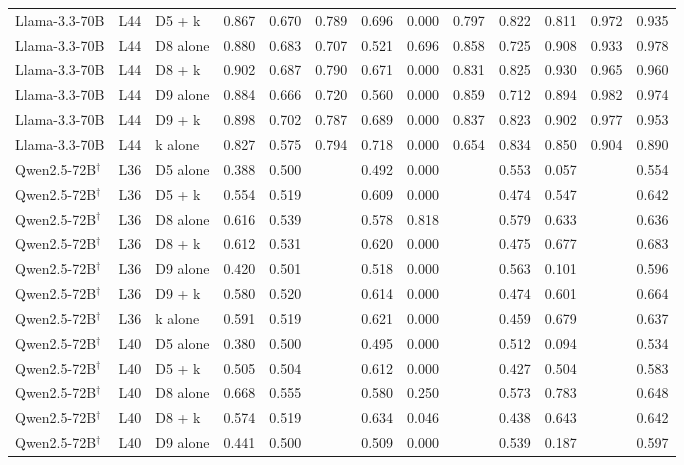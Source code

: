 \begin{table}
\begin{tabular}{lllrrrrrrrrrr}
Llama-3.3-70B & L44 & D5 + k & 0.867 & 0.670 & 0.789 & 0.696 & 0.000 & 0.797 & 0.822 & 0.811 & 0.972 & 0.935 \\
Llama-3.3-70B & L44 & D8 alone & 0.880 & 0.683 & 0.707 & 0.521 & 0.696 & 0.858 & 0.725 & 0.908 & 0.933 & 0.978 \\
Llama-3.3-70B & L44 & D8 + k & 0.902 & 0.687 & 0.790 & 0.671 & 0.000 & 0.831 & 0.825 & 0.930 & 0.965 & 0.960 \\
Llama-3.3-70B & L44 & D9 alone & 0.884 & 0.666 & 0.720 & 0.560 & 0.000 & 0.859 & 0.712 & 0.894 & 0.982 & 0.974 \\
Llama-3.3-70B & L44 & D9 + k & 0.898 & 0.702 & 0.787 & 0.689 & 0.000 & 0.837 & 0.823 & 0.902 & 0.977 & 0.953 \\
Llama-3.3-70B & L44 & k alone & 0.827 & 0.575 & 0.794 & 0.718 & 0.000 & 0.654 & 0.834 & 0.850 & 0.904 & 0.890 \\
Qwen2.5-72B$^\dagger$ & L36 & D5 alone & 0.388 & 0.500 &  & 0.492 & 0.000 &  & 0.553 & 0.057 &  & 0.554 \\
Qwen2.5-72B$^\dagger$ & L36 & D5 + k & 0.554 & 0.519 &  & 0.609 & 0.000 &  & 0.474 & 0.547 &  & 0.642 \\
Qwen2.5-72B$^\dagger$ & L36 & D8 alone & 0.616 & 0.539 &  & 0.578 & 0.818 &  & 0.579 & 0.633 &  & 0.636 \\
Qwen2.5-72B$^\dagger$ & L36 & D8 + k & 0.612 & 0.531 &  & 0.620 & 0.000 &  & 0.475 & 0.677 &  & 0.683 \\
Qwen2.5-72B$^\dagger$ & L36 & D9 alone & 0.420 & 0.501 &  & 0.518 & 0.000 &  & 0.563 & 0.101 &  & 0.596 \\
Qwen2.5-72B$^\dagger$ & L36 & D9 + k & 0.580 & 0.520 &  & 0.614 & 0.000 &  & 0.474 & 0.601 &  & 0.664 \\
Qwen2.5-72B$^\dagger$ & L36 & k alone & 0.591 & 0.519 &  & 0.621 & 0.000 &  & 0.459 & 0.679 &  & 0.637 \\
Qwen2.5-72B$^\dagger$ & L40 & D5 alone & 0.380 & 0.500 &  & 0.495 & 0.000 &  & 0.512 & 0.094 &  & 0.534 \\
Qwen2.5-72B$^\dagger$ & L40 & D5 + k & 0.505 & 0.504 &  & 0.612 & 0.000 &  & 0.427 & 0.504 &  & 0.583 \\
Qwen2.5-72B$^\dagger$ & L40 & D8 alone & 0.668 & 0.555 &  & 0.580 & 0.250 &  & 0.573 & 0.783 &  & 0.648 \\
Qwen2.5-72B$^\dagger$ & L40 & D8 + k & 0.574 & 0.519 &  & 0.634 & 0.046 &  & 0.438 & 0.643 &  & 0.642 \\
Qwen2.5-72B$^\dagger$ & L40 & D9 alone & 0.441 & 0.500 &  & 0.509 & 0.000 &  & 0.539 & 0.187 &  & 0.597 \\

\end{tabular}
\end{table}
